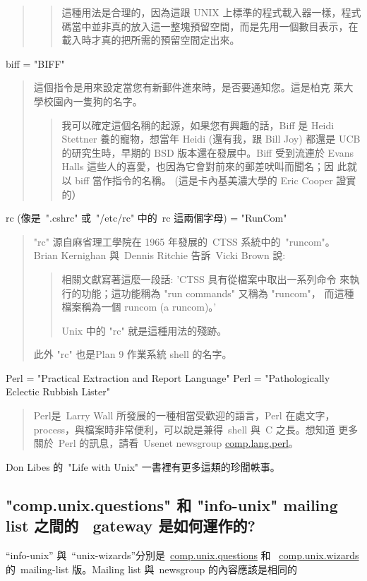 \documentclass{article}
\begin{document}
\begin{CJK*}{Bg5}{ming}
\begin{quote}
\begin{quotation}
	    這種用法是合理的，因為這跟 UNIX 上標準的程式載入器一樣，程式
	    碼當中並非真的放入這一整塊預留空間，而是先用一個數目表示，在
	    載入時才真的把所需的預留空間定出來。
    	\end{quotation}
    \end{quote}
    biff = "BIFF"
    \begin{quote}
	這個指令是用來設定當您有新郵件進來時，是否要通知您。這是柏克
	萊大學校園內一隻狗的名字。
    	\begin{quotation}
	    我可以確定這個名稱的起源，如果您有興趣的話，Biff 是 Heidi 
	    Stettner 養的寵物，想當年 Heidi (還有我，跟 Bill Joy) 都還是 
	    UCB 的研究生時，早期的 BSD 版本還在發展中。Biff 受到流連於 
	    Evans Halls 這些人的喜愛，也因為它會對前來的郵差吠叫而聞名；因
	    此就以 biff 當作指令的名稱。
	    (這是卡內基美濃大學的 Eric Cooper 證實的）
    	\end{quotation}
    \end{quote}
    rc (像是~".cshrc" 或~"/etc/rc" 中的~rc 這兩個字母) = "RunCom"
    \begin{quote}
	"rc" 源自麻省理工學院在 1965 年發展的~CTSS 系統中的~"runcom"。
	Brian Kernighan 與~Dennis Ritchie 告訴~Vicki Brown 說: 
    	\begin{quotation}
	    相關文獻寫著這麼一段話: 'CTSS 具有從檔案中取出一系列命令
	    來執行的功能；這功能稱為 "run commands" 又稱為 "runcom"，
	    而這種檔案稱為一個 runcom (a runcom)。'

	    Unix 中的 "rc" 就是這種用法的殘跡。
    	\end{quotation}
	此外 "rc" 也是Plan 9 作業系統 shell 的名字。
    \end{quote}
    Perl = "Practical Extraction and Report Language" \newline
    Perl = "Pathologically Eclectic Rubbish Lister"
    \begin{quote}
	Perl是~Larry Wall 所發展的一種相當受歡迎的語言，Perl 在處文字， 
	process，與檔案時非常便利，可以說是兼得~shell 與~C 之長。想知道
        更多關於~Perl 的訊息，請看~Usenet  newsgroup  \url{comp.lang.perl}。
    \end{quote}
    Don Libes 的~"Life with Unix" 一書裡有更多這類的珍聞軼事。

\subsection{"comp.unix.questions" 和 "info-unix" mailing list 之間的 
      ~gateway 是如何運作的?}

      ``info-unix'' 與~``unix-wizards''分別是~\url{comp.unix.questions} 和 
      ~\url{comp.unix.wizards} 的~mailing-list 版。Mailing list 與~newsgroup
      的內容應該是相同的


\end{CJK*}
\end{document}
